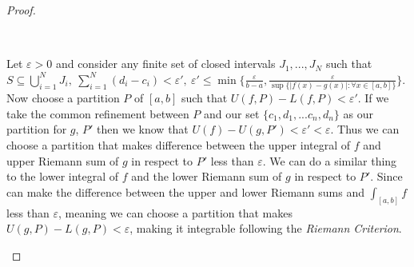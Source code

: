 \documentclass[11pt]{article}
\newenvironment{myproof}
{\begin{proof} \begin{adjustwidth}{3em}{0pt}$ $\par\nobreak\ignorespaces}
{\end{adjustwidth} \end{proof}}
\begin{document}
\begin{flushleft}
\begin{myproof}
Let $\varepsilon > 0$ and consider any finite set of closed intervals $J_1,...,J_N$ such that $S \subseteq \bigcup_{i=1}^NJ_i, \ \sum_{i=1}^N(d_i - c_i)<  \varepsilon', \ \varepsilon' \leq \min \{ \frac{\varepsilon}{b-a}, \frac{\varepsilon}{\sup \{|f(x)-g(x)|: \forall x \in [a,b]\} } \}$. Now choose a partition $P$ of $[a,b]$ such that $U(f,P) - L(f,P) < \varepsilon'$. If we take the common refinement between $P$ and our set $\{ c_1,d_1,...c_n,d_n \}$ as our partition for $g$, $P'$ then we know that $U(f) - U(g,P') < \varepsilon' < \varepsilon$. Thus we can choose a partition that makes difference between the upper integral of $f$ and upper Riemann sum of $g$ in respect to $P'$ less than $\varepsilon$. We can do a similar thing to the lower integral of $f$ and the lower Riemann sum of $g$ in respect to $P'$. Since can make the difference between the upper and lower Riemann sums and $\int_{[a,b]}f$ less than $\varepsilon$, meaning we can choose a partition that makes $U(g,P)-L(g,P) < \varepsilon$, making it integrable following the \textit{Riemann Criterion}.
\\
\bigskip

\end{myproof}
\end{flushleft}
\end{document}
